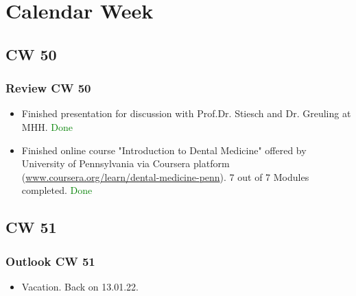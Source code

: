 \section{Calendar Week}
\subsection{CW 50}
\begin{frame}
  \frametitle{Review CW 50}
	\begin{itemize}
		\item Finished presentation for discussion with Prof.Dr. Stiesch and Dr. Greuling at MHH. \textcolor{green}{Done}
		\item Finished online course "Introduction to Dental Medicine" offered by University of Pennsylvania via Coursera platform (\url{www.coursera.org/learn/dental-medicine-penn}). 7 out of 7 Modules completed. \textcolor{green}{Done}
	\end{itemize}
\end{frame}


\subsection{CW 51}
\begin{frame}
  \frametitle{Outlook CW 51}
	\begin{itemize}
		\item Vacation. Back on 13.01.22.
	\end{itemize}
\end{frame}

